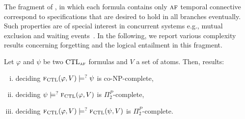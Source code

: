 \documentclass[letterpaper]{article} %
\begin{document}
The fragment of \CTL, in which each formula contains only $\textsc{a} \textsc{f}$ temporal connective correspond to specifications that are desired to hold in all branches eventually. Such properties are of special interest in concurrent systems e.g., mutual exclusion and  waiting events~\cite{Baier:PMC:2008}.
In the following, we report various complexity results concerning forgetting and the logical entailment in this fragment.

\begin{theorem}\label{thm:comF}
Let $\varphi$ and $\psi$ be two $\textrm{CTL}_{\textsc{a} \textsc{f}}$ formulas and $V$ a set of atoms. Then,
results:
\begin{enumerate}[(i)]
  \item deciding  ${\textsc{f}_{\textrm{CTL}}}(\varphi, V ) \models^? \psi$ is co-NP-complete,
  \item deciding  $\psi \models^? {\textsc{f}_{\textrm{CTL}}}(\varphi, V)$ is $\Pi_2^P$-complete,
  \item deciding ${\textsc{f}_{\textrm{CTL}}}(\varphi, V) \models^? {\textsc{f}_{\textrm{CTL}}}(\psi, V)$ is $\Pi_2^P$-complete.
\end{enumerate}
\end{theorem}
\end{document}
